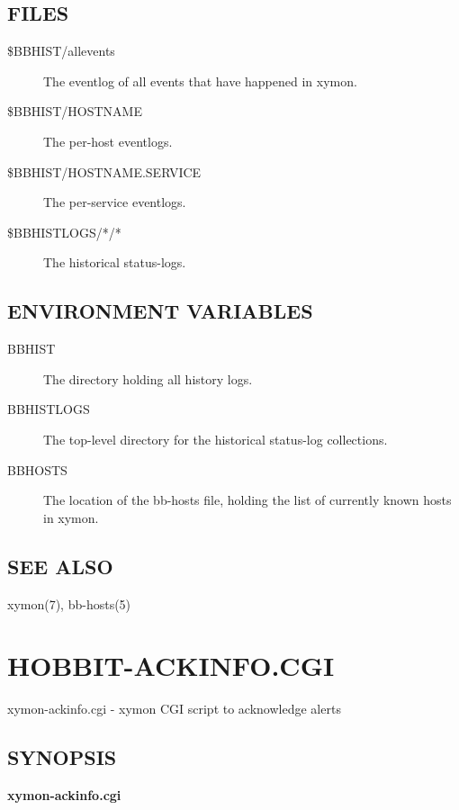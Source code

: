 \subsection{FILES}
\begin{description}
\item[\$BBHIST/allevents] The eventlog of all events that have happened in xymon. 

 

\item[\$BBHIST/HOSTNAME] The per-host eventlogs. 

 

\item[\$BBHIST/HOSTNAME.SERVICE] The per-service eventlogs. 

 

\item[\$BBHISTLOGS/*/*] The historical status-logs. 

 


\end{description}
\subsection{ENVIRONMENT VARIABLES}
\begin{description}
\item[BBHIST] The directory holding all history logs. 

 

\item[BBHISTLOGS] The top-level directory for the historical status-log collections. 

 

\item[BBHOSTS] The location of the bb-hosts file, holding the list of currently known hosts in xymon. 


\end{description}
\subsection{SEE ALSO}
xymon(7), bb-hosts(5) 


%
\newpage
\section{HOBBIT-ACKINFO.CGI}
 xymon-ackinfo.cgi - xymon CGI script to acknowledge alerts \subsection{SYNOPSIS}
\textbf{xymon-ackinfo.cgi}


